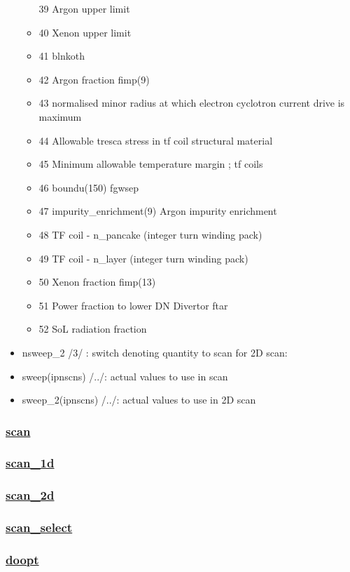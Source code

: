 \documentclass[]{article}
\begin{document}
\begin{itemize}
\begin{itemize}
    39 Argon upper limit
  \item
    40 Xenon upper limit
  \item
    41 blnkoth
  \item
    42 Argon fraction fimp(9)
  \item
    43 normalised minor radius at which electron cyclotron current drive
    is maximum
  \item
    44 Allowable tresca stress in tf coil structural material
  \item
    45 Minimum allowable temperature margin ; tf coils
  \item
    46 boundu(150) fgwsep
  \item
    47 impurity\_enrichment(9) Argon impurity enrichment
  \item
    48 TF coil - n\_pancake (integer turn winding pack)
  \item
    49 TF coil - n\_layer (integer turn winding pack)
  \item
    50 Xenon fraction fimp(13)
  \item
    51 Power fraction to lower DN Divertor ftar
  \item
    52 SoL radiation fraction
  \end{itemize}
\item
  nsweep\_2 /3/ : switch denoting quantity to scan for 2D scan:
\item
  sweep(ipnscns) /../: actual values to use in scan
\item
  sweep\_2(ipnscns) /../: actual values to use in 2D scan
\end{itemize}

\subsubsection{\texorpdfstring{\href{scan.html}{scan}}{scan}}\label{scan}

\subsubsection{\texorpdfstring{\href{scan_1d.html}{scan\_1d}}{scan\_1d}}\label{scan_1d}

\subsubsection{\texorpdfstring{\href{scan_2d.html}{scan\_2d}}{scan\_2d}}\label{scan_2d}

\subsubsection{\texorpdfstring{\href{scan_select.html}{scan\_select}}{scan\_select}}\label{scan_select}

\subsubsection{\texorpdfstring{\href{doopt.html}{doopt}}{doopt}}\label{doopt}
\end{document}
